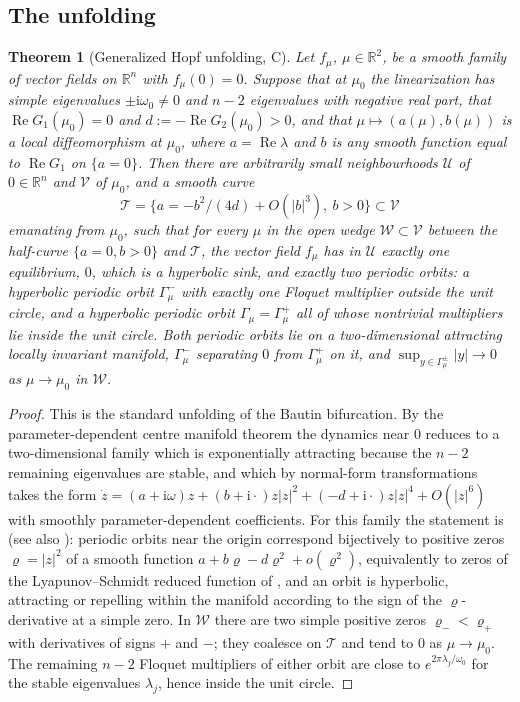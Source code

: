 \documentclass[11pt,a4paper]{article}
\theoremstyle{plain}
\newtheorem{theorem}{Theorem}[section]
\theoremstyle{definition}
\theoremstyle{remark}
\newcommand{\R}{\mathbb R}
\newcommand{\ii}{\mathrm i}
\newcommand{\cW}{\mathcal W}
\newcommand{\abs}[1]{\lvert#1\rvert}
\DeclareMathOperator{\Ree}{Re}
\newcommand{\evC}{\textsf{C}}
\begin{document}
\subsection{The unfolding}
\begin{theorem}[Generalized Hopf unfolding, \evC]\label{thm:unfold}
Let $f_\mu$, $\mu\in\R^2$, be a smooth family of vector fields on $\R^n$ with $f_\mu(0)=0$. Suppose that at $\mu_0$ the linearization has simple eigenvalues $\pm\ii\omega_0\neq0$ and $n-2$ eigenvalues with negative real part, that $\Ree G_1(\mu_0)=0$ and $d:=-\Ree G_2(\mu_0)>0$, and that $\mu\mapsto(a(\mu),b(\mu))$ is a local diffeomorphism at $\mu_0$, where $a=\Ree\lambda$ and $b$ is any smooth function equal to $\Ree G_1$ on $\{a=0\}$. Then there are arbitrarily small neighbourhoods $\mathcal U$ of $0\in\R^n$ and $\mathcal V$ of $\mu_0$, and a smooth curve
\[
\mathcal T=\{a=-b^2/(4d)+O(\abs b^3),\ b>0\}\subset\mathcal V
\]
emanating from $\mu_0$, such that for every $\mu$ in the open wedge $\cW\subset\mathcal V$ between the half-curve $\{a=0,b>0\}$ and $\mathcal T$, the vector field $f_\mu$ has in $\mathcal U$ exactly one equilibrium, $0$, which is a hyperbolic sink, and exactly two periodic orbits: a hyperbolic periodic orbit $\Gamma^-_\mu$ with exactly one Floquet multiplier outside the unit circle, and a hyperbolic periodic orbit $\Gamma_\mu=\Gamma^+_\mu$ all of whose nontrivial multipliers lie inside the unit circle. Both periodic orbits lie on a two-dimensional attracting locally invariant manifold, $\Gamma^-_\mu$ separating $0$ from $\Gamma^+_\mu$ on it, and $\sup_{y\in\Gamma^\pm_\mu}\abs y\to0$ as $\mu\to\mu_0$ in $\cW$.
\end{theorem}
\begin{proof}
This is the standard unfolding of the Bautin bifurcation. By the parameter-dependent centre manifold theorem \cite{Carr81} the dynamics near $0$ reduces to a two-dimensional family which is exponentially attracting because the $n-2$ remaining eigenvalues are stable, and which by normal-form transformations takes the form $\dot z=(a+\ii\omega)z+(b+\ii\cdot)z\abs z^2+(-d+\ii\cdot)z\abs z^4+O(\abs z^6)$ with smoothly parameter-dependent coefficients. For this family the statement is \cite[Section~8.3]{Kuznetsov23} (see also \cite{Takens73,GuckenheimerHolmes83,DelmeireBosschaertKuznetsov25}): periodic orbits near the origin correspond bijectively to positive zeros $\varrho=\abs z^2$ of a smooth function $a+b\varrho-d\varrho^2+o(\varrho^2)$, equivalently to zeros of the Lyapunov--Schmidt reduced function of \cite{GolubitskyLangford81}, and an orbit is hyperbolic, attracting or repelling within the manifold according to the sign of the $\varrho$-derivative at a simple zero. In $\cW$ there are two simple positive zeros $\varrho_-<\varrho_+$ with derivatives of signs $+$ and $-$; they coalesce on $\mathcal T$ and tend to $0$ as $\mu\to\mu_0$. The remaining $n-2$ Floquet multipliers of either orbit are close to $e^{2\pi\lambda_j/\omega_0}$ for the stable eigenvalues $\lambda_j$, hence inside the unit circle.
\end{proof}
\end{document}
